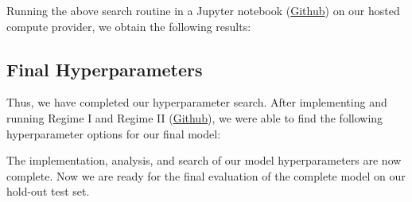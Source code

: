 

\noindent
Running the above search routine in a Jupyter notebook (\href{https://github.com/ShenZhouHong/radiography-ai-project/blob/13893a1c14cbfdd78876fda2a45aa765377d7cfc/python/hyperparam-search/regime-2.ipynb}{Github}) on our hosted compute provider, we obtain the following results:





\subsection{Final Hyperparameters}

Thus, we have completed our hyperparameter search. After implementing and running Regime I and Regime II (\href{https://github.com/ShenZhouHong/radiography-ai-project/tree/13893a1c14cbfdd78876fda2a45aa765377d7cfc/python/hyperparam-search}{Github}), we were able to find the following hyperparameter options for our final model:



\noindent
The implementation, analysis, and search of our model hyperparameters are now complete. Now we are ready for the final evaluation of the complete model on our hold-out test set.